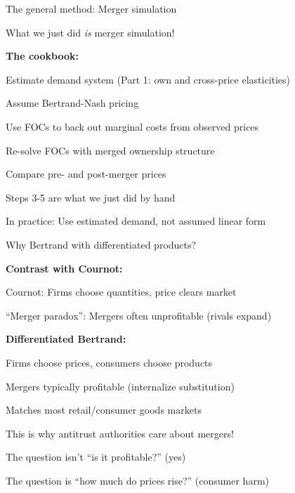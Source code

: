 \documentclass[notes,11pt, aspectratio=169]{beamer}
\newenvironment{wideitemize}{\itemize\addtolength{\itemsep}{10pt}}{\enditemize}
\newenvironment{wideenumerate}{\enumerate\addtolength{\itemsep}{10pt}}{\endenumerate}
\begin{document}
\begin{frame}{The general method: Merger simulation}
	\begin{wideitemize}
		\item What we just did \textit{is} merger simulation!
		\item \textbf{The cookbook:}
		\begin{wideenumerate}
			\item Estimate demand system (Part 1: own and cross-price elasticities)
			\item Assume Bertrand-Nash pricing
			\item Use FOCs to back out marginal costs from observed prices
			\item Re-solve FOCs with merged ownership structure
			\item Compare pre- and post-merger prices
		\end{wideenumerate}
		\item Steps 3-5 are what we just did by hand
		\item In practice: Use estimated demand, not assumed linear form
	\end{wideitemize}
\end{frame}

\begin{frame}{Why Bertrand with differentiated products?}
	\begin{wideitemize}
		\item \textbf{Contrast with Cournot:}
		\begin{wideitemize}
			\vspace{5pt}
			\item Cournot: Firms choose quantities, price clears market
			\item ``Merger paradox'': Mergers often unprofitable (rivals expand)
		\end{wideitemize}
		\item \textbf{Differentiated Bertrand:}
		\begin{wideitemize}
			\vspace{5pt}
			\item Firms choose prices, consumers choose products
			\item Mergers typically profitable (internalize substitution)
			\item Matches most retail/consumer goods markets
		\end{wideitemize}
		\item This is why antitrust authorities care about mergers!
		\item The question isn't ``is it profitable?'' (yes)
		\item The question is ``how much do prices rise?'' (consumer harm)
	\end{wideitemize}
\end{frame}
\end{document}
